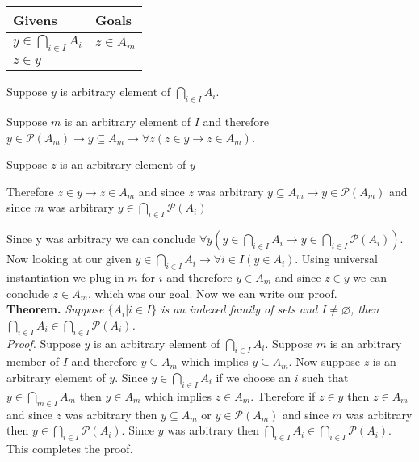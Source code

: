 \documentclass{article}
\newcommand{\n}{ \noindent }
\newcommand{\pwset}{\mathscr{P}}
\begin{document}
\begin{table}[h]
\begin{tabular}{ll}
\hline
Givens & Goals   \\ \hline
$y \in \bigcap_{i \in I} A_i$ & $z \in A_m$   \\
$z \in y$ & \\ \hline
\end{tabular}
\end{table}

\n Suppose $y$ is arbitrary element of $\bigcap_{i \in I} A_i$.

\begin{addmargin}[0.55cm]{0cm}
Suppose $m$ is an arbitrary element of $I$ and therefore $y \in \pwset(A_m) \rightarrow y \subseteq A_m \rightarrow \forall z (z \in y \rightarrow z \in A_m)$.
\end{addmargin}

\indent \indent Suppose $z$ is an arbitrary element of $y$ \\
\indent \indent \indent [proof of $z \in A_m$] 
\begin{addmargin}[0.55cm]{0cm}
Therefore $z \in y \rightarrow z \in A_m$ and since $z$ was arbitrary $y \subseteq A_m \rightarrow y \in \pwset(A_m)$ and since $m$ was arbitrary $y \in \bigcap_{i \in I} \pwset(A_i)$
\end{addmargin}
\n Since y was arbitrary we can conclude $\forall y (y \in \bigcap_{i \in I} A_i \rightarrow y \in \bigcap_{i \in I} \pwset(A_i))$. \\

\n Now looking at our given $y \in \bigcap_{i \in I} A_i \rightarrow \forall i \in I(y \in A_i)$. Using universal instantiation we plug in $m$ for $i$ and therefore $y \in A_m$ and since $z \in y$ we can conclude $z \in A_m$, which was our goal. Now we can write our proof. \\

\n \textbf{Theorem.} \textit{Suppose $ \{ A_i | i \in I \}$ is an indexed family of sets and $ I \neq \varnothing$, then $\bigcap_{i \in I} A_i \in \bigcap_{i \in I} \pwset(A_i)$.} \\
\n \textit{Proof.} Suppose $y$ is an arbitrary element of $\bigcap_{i \in I} A_i$. Suppose $m$ is an arbitrary member of $I$ and therefore $y \subseteq A_m$ which implies $y \subseteq A_m$. Now suppose $z$ is an arbitrary element of $y$. Since $y \in \bigcap_{i \in I} A_i$ if we choose an $i$ such that $y \in \bigcap_{m \in I} A_m$ then $y \in A_m$ which implies $z \in A_m$. Therefore if $z \in y$ then $z \in A_m$ and since $z$ was arbitrary then $y \subseteq A_m$ or $y \in \pwset(A_m)$ and since $m$ was arbitrary then $y \in \bigcap_{i \in I} \pwset(A_i)$. Since $y$ was arbitrary then $\bigcap_{i \in I} A_i \in \bigcap_{i \in I} \pwset(A_i)$. This completes the proof.
\end{document}
